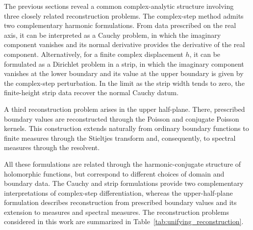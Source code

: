 \documentclass[11pt]{article}
\begin{document}
   The previous sections reveal a common complex-analytic structure involving
   three closely related reconstruction problems. The complex-step method
   admits two complementary harmonic formulations. From data prescribed on
   the real axis, it can be interpreted as a Cauchy problem, in which the
   imaginary component vanishes and its normal derivative provides the
   derivative of the real component. Alternatively, for a finite complex
   displacement \(h\), it can be formulated as a Dirichlet problem in a
   strip, in which the imaginary component vanishes at the lower boundary
   and its value at the upper boundary is given by the complex-step
   perturbation. In the limit as the strip width tends to zero, the
   finite-height strip data recover the normal Cauchy datum.
   
   A third reconstruction problem arises in the upper half-plane. There,
   prescribed boundary values are reconstructed through the Poisson and
   conjugate Poisson kernels. This construction extends naturally from
   ordinary boundary functions to finite measures through the Stieltjes
   transform and, consequently, to spectral measures through the
   resolvent.
   
   All these formulations are related through the harmonic-conjugate structure
   of holomorphic functions, but correspond to different choices of domain
   and boundary data. The Cauchy and strip formulations provide two
   complementary interpretations of complex-step differentiation, whereas
   the upper-half-plane formulation describes reconstruction from prescribed
   boundary values and its extension to measures and spectral measures. The reconstruction problems considered in this work are summarized in
   Table~\ref{tab:unifying_reconstruction}.
   
\end{document}
